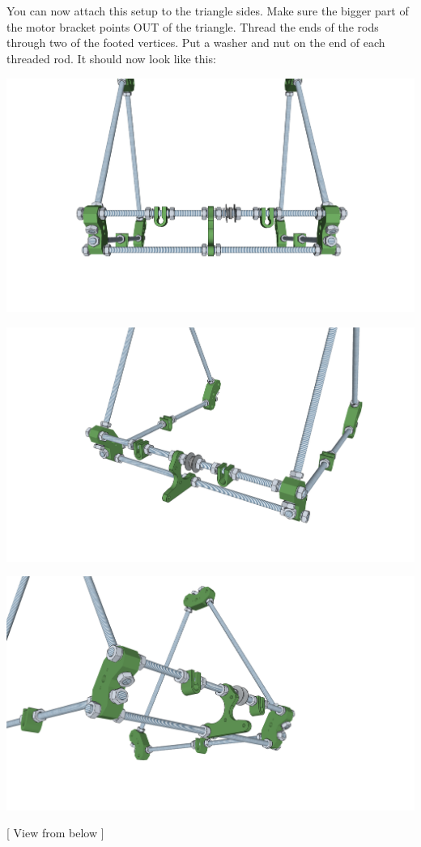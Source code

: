 \documentclass[twoside,a4paper,titlepage]{memoir}
\begin{document}
	\section{}
	You can now attach this setup to the triangle sides. Make sure the bigger part of the motor bracket
	points OUT of the triangle. Thread the ends of the rods through two of the footed vertices. Put a washer
	and nut on the end of each threaded rod. It should now look like this:
	\begin{center}
		\includegraphics[width=1\linewidth]{graphics/ch2_7_1.png}
	\end{center}
	\begin{center}
		\includegraphics[width=1\linewidth]{graphics/ch2_7_2.png}
	\end{center}
	\begin{center}
		\includegraphics[width=1\linewidth]{graphics/ch2_7_3.png}
	\end{center}
	[ View from below ]
	
\end{document}
